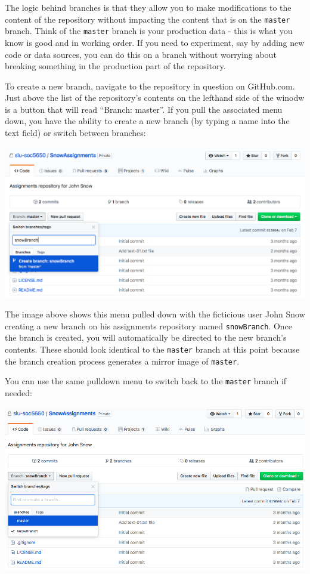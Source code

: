 \documentclass[]{book}
\theoremstyle{definition}
\theoremstyle{definition}
\theoremstyle{remark}
\begin{document}
The logic behind branches is that they allow you to make modifications
to the content of the repository without impacting the content that is
on the \texttt{master} branch. Think of the \texttt{master} branch is
your production data - this is what you know is good and in working
order. If you need to experiment, say by adding new code or data
sources, you can do this on a branch without worrying about breaking
something in the production part of the repository.

To create a new branch, navigate to the repository in question on
GitHub.com. Just above the list of the repository's contents on the
lefthand side of the winodw is a button that will read ``Branch:
master''. If you pull the associated menu down, you have the ability to
create a new branch (by typing a name into the text field) or switch
between branches:

\includegraphics[width=1\linewidth]{images/branch1}

The image above shows this menu pulled down with the ficticious user
John Snow creating a new branch on his assignments repository named
\texttt{snowBranch}. Once the branch is created, you will automatically
be directed to the new branch's contents. These should look identical to
the \texttt{master} branch at this point because the branch creation
process generates a mirror image of \texttt{master}.

You can use the same pulldown menu to switch back to the \texttt{master}
branch if needed:

\includegraphics[width=1\linewidth]{images/branch2}
\end{document}
